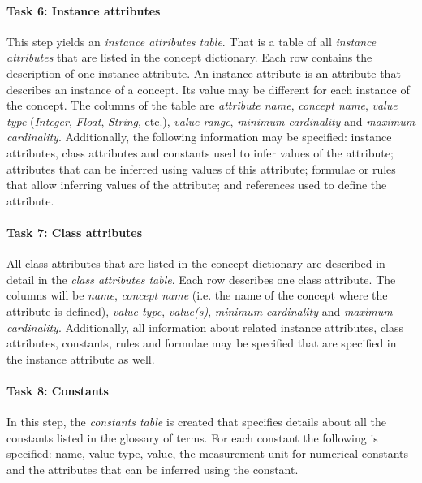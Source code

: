 
\paragraph{Task 6: Instance attributes}

This step yields an \emph{instance attributes table}. That is a table of all \emph{instance attributes} that are listed in the concept dictionary. Each row contains the description of one instance attribute. An instance attribute is an attribute that describes an instance of a concept. Its value may be different for each instance of the concept. The columns of the table are \emph{attribute name}, \emph{concept name}, \emph{value type} (\emph{Integer}, \emph{Float}, \emph{String}, etc.), \emph{value range}, \emph{minimum cardinality} and \emph{maximum cardinality}. Additionally, the following information may be specified: instance attributes, class attributes and constants used to infer values of the attribute; attributes that can be inferred using values of this attribute; formulae or rules that allow inferring values of the attribute; and references used to define the attribute.

\paragraph{Task 7: Class attributes}

All class attributes that are listed in the concept dictionary are described in detail in the \emph{class attributes table}. Each row describes one class attribute. The columns will be \emph{name}, \emph{concept name} (i.e. the name of the concept where the attribute is defined), \emph{value type}, \emph{value(s)}, \emph{minimum cardinality} and \emph{maximum cardinality}. Additionally, all information about related instance attributes, class attributes, constants, rules and formulae may be specified that are specified in the instance attribute as well.

\paragraph{Task 8: Constants}

In this step, the \emph{constants table} is created that specifies details about all the constants listed in the glossary of terms. For each constant the following is specified: name, value type, value, the measurement unit for numerical constants and the attributes that can be inferred using the constant.

